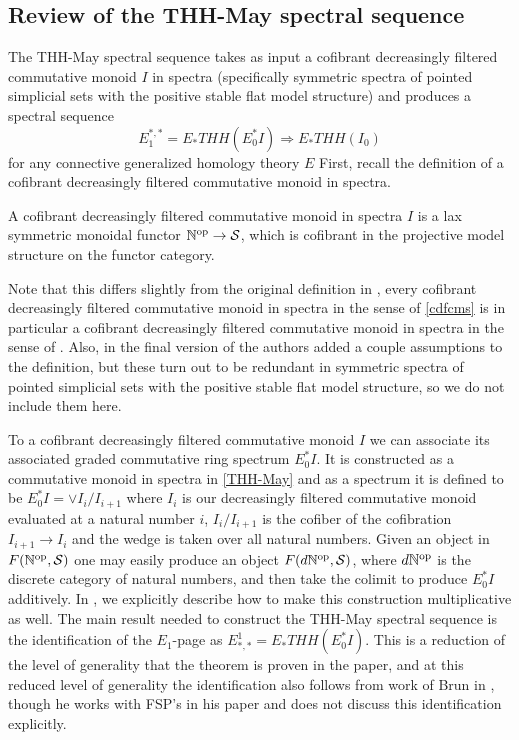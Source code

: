 \subsection{Review of the THH-May spectral sequence}
The THH-May spectral sequence takes as input a cofibrant decreasingly filtered commutative monoid $I$ in spectra (specifically symmetric spectra of pointed simplicial sets with the positive stable flat model structure) and produces a spectral sequence 
\[ E_1^{*,*}=E_*THH(E_0^*I) \Rightarrow E_*THH(I_0)\]
for any connective generalized homology theory $E$
First, recall the definition of a cofibrant decreasingly filtered commutative monoid in spectra. 
\begin{defn} \label{cdfcms}
A cofibrant decreasingly filtered commutative monoid in spectra $I$ is a lax symmetric monoidal functor $\mathbb{N}^{\mathrm{op}}\rightarrow \mathcal{S}$, which is cofibrant in the projective model structure on the functor category.
\end{defn}
\begin{rmk}
Note that this differs slightly from the original definition in \cite{THH-May}, every cofibrant decreasingly filtered commutative monoid in spectra in the sense of \ref{cdfcms} is in particular a cofibrant decreasingly filtered commutative monoid in spectra in the sense of \cite[Def. qx]{THH-May}. Also, in the final version of \cite{THH-May} the authors added a couple assumptions to the definition, but these turn out to be redundant in symmetric spectra of pointed simplicial sets with the positive stable flat model structure, so we do not include them here. 
\end{rmk}
To a cofibrant decreasingly filtered commutative monoid $I$ we can associate its associated graded commutative ring spectrum $E_0^*I$. It is constructed as a commutative monoid in spectra in \ref{THH-May} and as a spectrum it is defined to be $E_0^*I=\vee I_i/I_{i+1}$ where $I_i$ is our decreasingly filtered commutative monoid evaluated at a natural number $i$, $I_i/I_{i+1}$ is the cofiber of the cofibration $I_{i+1}\rightarrow I_i$ and the wedge is taken over all natural numbers. Given an object in $F(\mathbb{N}^{\mathrm{op}},\mathcal{S})$ one may easily produce an object $F(d\mathbb{N}^{\mathrm{op}},\mathcal{S})$, where $d\mathbb{N}^{\mathrm{op}}$ is the discrete category of natural numbers, and then take the colimit to produce $E_0^*I$ additively. In \cite{THH-May}, we explicitly describe how to make this construction multiplicative as well. The main result needed to construct the THH-May spectral sequence is the identification of the $E_1$-page as $E^1_{*,*}=E_*THH(E_0^*I)$. This is a reduction of the level of generality that the theorem is proven in the paper, and at this reduced level of generality the identification also follows from work of Brun in \cite{qx}, though he works with FSP's in his paper and does not discuss this identification explicitly. 

